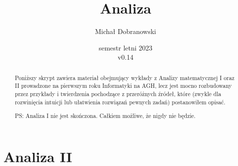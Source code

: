 \documentclass[11pt]{scrartcl}
\title{Analiza}
\author{Michał Dobranowski}
\date{semestr letni 2023\\ v0.14}
\begin{document}
    \maketitle
    \begin{abstract}
        Poniższy skrypt zawiera materiał obejmujący wykłady z Analizy matematycznej I oraz II prowadzone na pierwszym roku Informatyki na AGH, lecz jest mocno rozbudowany przez przykłady i twierdzenia pochodzące z przeróżnych źródeł, które (zwykle dla rozwinięcia intuicji lub ułatwienia rozwiązań pewnych zadań) postanowiłem opisać.

        PS: Analiza I nie jest skończona. Całkiem możliwe, że nigdy nie będzie.
    \end{abstract}
    \tableofcontents
    \eject






    \part{Analiza II}
\end{document}
